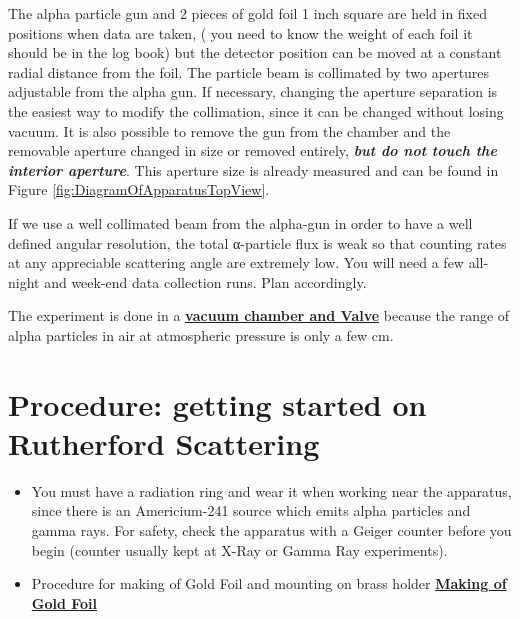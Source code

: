 \documentclass{../lab}
\begin{document}
The alpha particle gun and 2 pieces of gold foil 1 inch square are held in fixed positions when data are taken, ( you need to know the weight of each foil it should be in the log book) but the detector position can be moved at a constant radial distance from the foil. The particle beam is collimated by two apertures adjustable from the alpha gun. If necessary, changing the aperture separation is the easiest way to modify the collimation, since it can be changed without losing vacuum. It is also possible to remove the gun from the chamber and the removable aperture changed in size or removed entirely, \emph{\textbf{but do not touch the interior aperture}}. This aperture size is already measured and can be found in Figure \ref{fig:DiagramOfApparatusTopView}.

If we use a well collimated beam from the alpha-gun in order to have a well defined angular resolution, the total α-particle flux is weak so that counting rates at any appreciable scattering angle are extremely low. You will need a few all-night and week-end data collection runs. Plan accordingly.

The experiment is done in a \href{http://experimentationlab.berkeley.edu/sites/default/files/images/RUT\_Chamber.jpg}{\textbf{vacuum chamber and Valve}} because the range of alpha particles in air at atmospheric pressure is only a few cm.

\section{Procedure: getting started on Rutherford Scattering}

\begin{itemize}
    \item You must have a radiation ring and wear it when working near the apparatus, since there is an Americium-241 source which emits alpha particles and gamma rays. For safety, check the apparatus with a Geiger counter before you begin (counter usually kept at X-Ray or Gamma Ray experiments).

    \item Procedure for making of Gold Foil and mounting on brass holder \href{http://physics111.lib.berkeley.edu/Physics111/Reprints/RUT/Procedure\%20for\%20Making\%20Foils.pdf}{\textbf{Making of Gold Foil}}

\end{itemize}
\end{document}
